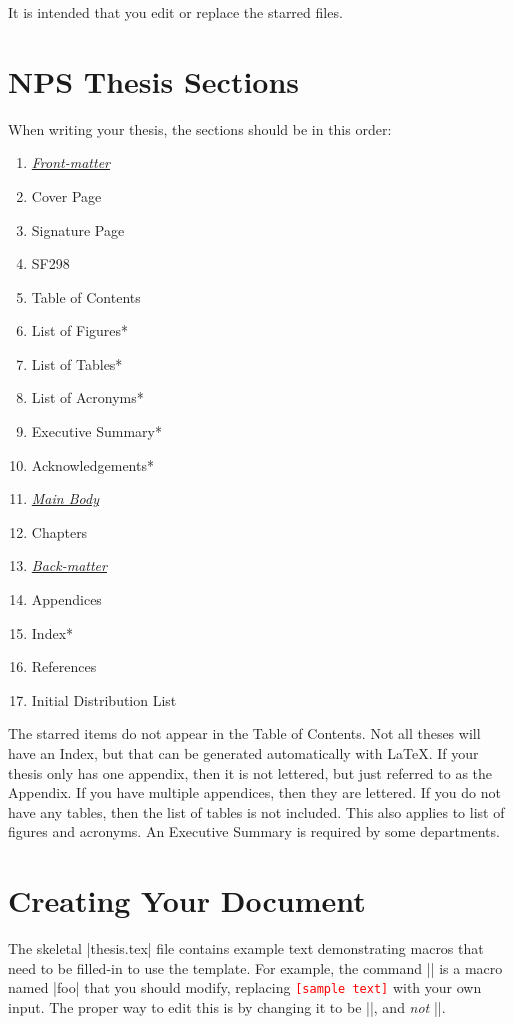 It is intended that you edit or replace the starred files.



\section{NPS Thesis Sections}
When writing your thesis, the sections should be in this order:
\begin{enumerate}
  \item[] \hspace{-3em} \underline{\textit{Front-matter}}
  \item Cover Page
  \item Signature Page
  \item SF298
  \item Table of Contents
  \item List of Figures*
  \item List of Tables*
  \item List of Acronyms*
  \item Executive Summary*
  \item Acknowledgements*
  \item[] \hspace{-3em} \underline{\textit{Main Body}}
  \item Chapters
  \item[] \hspace{-3em} \underline{\textit{Back-matter}}
  \item Appendices
  \item Index*
  \item References
  \item Initial Distribution List
\end{enumerate}

The starred items do not appear in the Table of Contents.  Not all theses
will have an Index, but that can be generated automatically with
\LaTeX{}.  If your thesis only has one appendix, then it is not
lettered, but just referred to as the Appendix.  If you have multiple
appendices, then they are lettered.  If you do not have any tables,
then the list of tables is not included.  This also applies to list of
figures and acronyms.  An Executive Summary is required by
some departments.


\section{Creating Your Document}
The skeletal |thesis.tex| file contains example
text demonstrating macros that need to be filled-in to use the template.
For example, the command ||
is a macro named |foo| that you should modify, replacing
\textcolor{red}{\texttt{[sample text]}} with your own input. The proper way to edit this
is by changing it to be ||, and \emph{not} ||.

